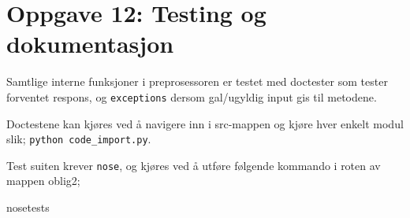 \section*{Oppgave 12: Testing og dokumentasjon}

Samtlige interne funksjoner i preprosessoren er testet med doctester som tester forventet respons, og \verb;exceptions; dersom gal/ugyldig input gis til metodene.

Doctestene kan kjøres ved å navigere inn i src-mappen og kjøre hver enkelt modul slik; \verb;python code_import.py;.

Test suiten krever \verb;nose;, og kjøres ved å utføre følgende kommando i roten av mappen oblig2;

nosetests

